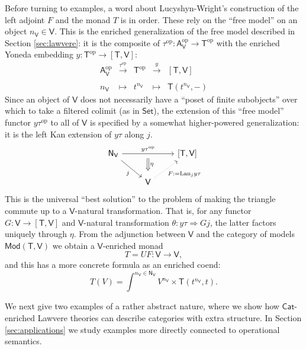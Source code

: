 \documentclass{amsart}
\theoremstyle{definition}
\newcommand{\Set}{\mathsf{Set}}
\newcommand{\Cat}{\mathsf{Cat}}
\newcommand{\Mod}{\mathsf{Mod}}
\newcommand{\NN}{\mathsf{N}}
\newcommand{\A}{\mathsf{A}}
\newcommand{\V}{\mathsf{V}}
\newcommand{\T}{\mathsf{T}}
\newcommand{\op}{\mathrm{op}}
\newcommand{\maps}{\colon}
\begin{document}
Before turning to examples, a word about Lucyshyn-Wright's construction of the left adjoint $F$ and the monad $T$ is in order.  These rely on the ``free model'' on an object $n_\V \in \V$.   This is the enriched generalization of the free model described in Section \ref{sec:lawvere}: it is the composite of $\tau^\op\maps \A_\V^\op \to \T^\op$ with the enriched Yoneda embedding $y\maps \T^\op \to [\T,\V]$:
\[
\begin{array}{rllll}
\A_\V^\op & \xrightarrow{\tau^\op} & \T^\op & \xrightarrow{y} & \left[\T,\V\right]\\
\\
n_\V & \mapsto & t^{n_\V} & \mapsto & \T(t^{n_\V},-)
\end{array}
\]
Since an object of $\V$ does not necessarily have a ``poset of finite subobjects'' over which to take a filtered colimit (as in $\Set$), the extension of this ``free model'' functor $y \tau^\op$ to all of $\V$ is specified by a somewhat higher-powered generalization: it is the left Kan extension of $y\tau$ along $j$.
\[\begin{tikzcd}
\NN_\V \arrow[rr,"y\tau^\op"{name=y}] \arrow[swap,rd,"j"] & & \left[\T,\V\right]\\
& \V \arrow[swap,dotted, ru,"F:=\mathrm{Lan}_jy\tau"] \arrow[Rightarrow,from=y,"\eta", shorten >=0.2cm,shorten <=.2cm]
\end{tikzcd}\]
This is the universal ``best solution'' to the problem of making the triangle commute up to a $\V$-natural transformation.  That is, for any functor $G \maps \V \to [\T,\V]$ and $\V$-natural transformation $\theta \maps y\tau \Rightarrow Gj$, the latter factors uniquely through $\eta$.
From the adjunction between $\V$ and the category of models $\Mod(\T,\V)$ we obtain a $\V$-enriched monad
\[       T = U F \maps \V \to \V, \]
and this has a more concrete formula as an enriched coend:
\[
T(V) = \int^{n_\V\in \NN_\V} V^{n_\V} \times \T(t^{n_\V},t).
\]

We next give two examples of a rather abstract nature, where we show how $\Cat$-enriched Lawvere theories can describe categories with extra structure.   In Section \ref{sec:applications} we study examples more directly connected to operational semantics.
\end{document}
